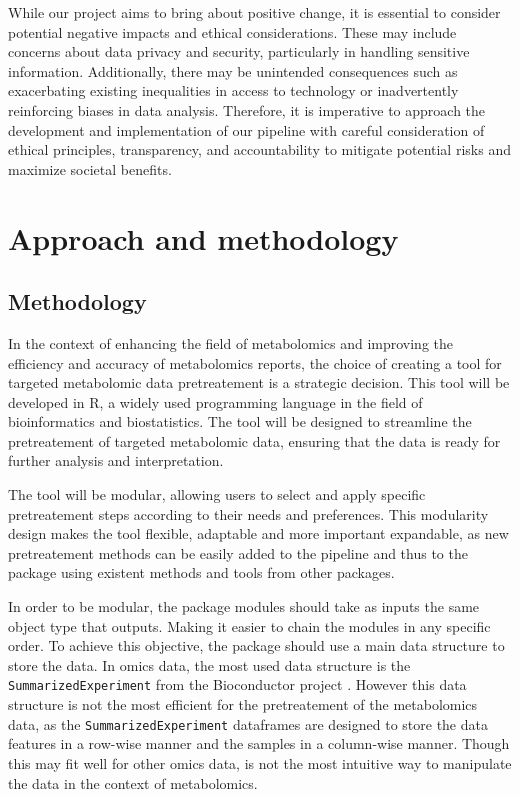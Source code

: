 \documentclass[ENG, BIB]{TFUOC}%
\begin{document}
\vspace{18pt}

While our project aims to bring about positive change, it is essential to consider potential negative impacts and ethical considerations. These may include concerns about data privacy and security, particularly in handling sensitive information. Additionally, there may be unintended consequences such as exacerbating existing inequalities in access to technology or inadvertently reinforcing biases in data analysis. Therefore, it is imperative to approach the development and implementation of our pipeline with careful consideration of ethical principles, transparency, and accountability to mitigate potential risks and maximize societal benefits.

\chapter{Approach and methodology}
\section{Methodology}

In the context of enhancing the field of metabolomics and improving the efficiency and accuracy of metabolomics reports, the choice of creating a tool for targeted metabolomic data pretreatement is a strategic decision. This tool will be developed in R, a widely used programming language in the field of bioinformatics and biostatistics. The tool will be designed to streamline the pretreatement of targeted metabolomic data, ensuring that the data is ready for further analysis and interpretation. 

The tool will be modular, allowing users to select and apply specific pretreatement steps according to their needs and preferences. This modularity design makes the tool flexible, adaptable and more important expandable, as new pretreatement methods can be easily added to the pipeline and thus to the package using existent methods and tools from other packages.

In order to be modular, the package modules should take as inputs the same object type that outputs. Making it easier to chain the modules in any specific order. To achieve this objective, the package should use a main data structure to store the data. In omics data, the most used data structure is the \texttt{SummarizedExperiment} from the Bioconductor project \cite{R-SummarizedExperiment}. However this data structure is not the most efficient for the pretreatement of the metabolomics data, as the \texttt{SummarizedExperiment} dataframes are designed to store the data features in a row-wise manner and the samples in a column-wise manner. Though this may fit well for other omics data, is not the most intuitive way to manipulate the data in the context of metabolomics.
\end{document}
